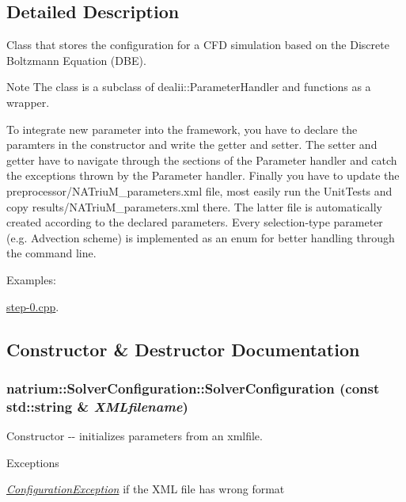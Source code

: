 \subsection{Detailed Description}
Class that stores the configuration for a CFD simulation based on the Discrete Boltzmann Equation (DBE). \begin{DoxyNote}{Note}
The class is a subclass of dealii::ParameterHandler and functions as a wrapper. 

To integrate new parameter into the framework, you have to declare the paramters in the constructor and write the getter and setter. The setter and getter have to navigate through the sections of the Parameter handler and catch the exceptions thrown by the Parameter handler. Finally you have to update the preprocessor/NATriuM\_\-parameters.xml file, most easily run the UnitTests and copy results/NATriuM\_\-parameters.xml there. The latter file is automatically created according to the declared parameters. Every selection-\/type parameter (e.g. Advection scheme) is implemented as an enum for better handling through the command line. 
\end{DoxyNote}
\begin{Desc}
\item[Examples: ]\par


\hyperlink{step-0_8cpp-example}{step-\/0.cpp}.\end{Desc}


\subsection{Constructor \& Destructor Documentation}
\hypertarget{classnatrium_1_1SolverConfiguration_a062fa86eca607f830540ef4f2c06f0b3}{
\subsubsection[{SolverConfiguration}]{\setlength{\rightskip}{0pt plus 5cm}natrium::SolverConfiguration::SolverConfiguration (const std::string \& {\em XMLfilename})}}
\label{classnatrium_1_1SolverConfiguration_a062fa86eca607f830540ef4f2c06f0b3}


Constructor -\/-\/ initializes parameters from an xmlfile. 
\begin{DoxyExceptions}{Exceptions}
\item[{\em \hyperlink{classnatrium_1_1ConfigurationException}{ConfigurationException}}]if the XML file has wrong format \end{DoxyExceptions}


